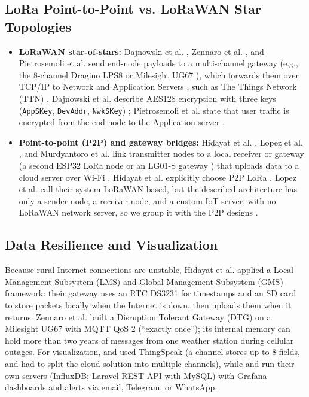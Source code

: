 \documentclass[conference]{IEEEtran}
\begin{document}
\subsection{LoRa Point-to-Point vs. LoRaWAN Star Topologies}
\begin{itemize}
    \item \textbf{LoRaWAN star-of-stars:} Dajnowski et al. \cite{dajnowski2024}, Zennaro et al. \cite{zennaro2025}, and Pietrosemoli et al. \cite{pietrosemoli2019} send end-node payloads to a multi-channel gateway (e.g., the 8-channel Dragino LPS8 \cite{dajnowski2024} or Milesight UG67 \cite{zennaro2025}), which forwards them over TCP/IP to Network and Application Servers \cite{dajnowski2024, zennaro2025, pietrosemoli2019}, such as The Things Network (TTN) \cite{dajnowski2024, pietrosemoli2019}. Dajnowski et al. describe AES128 encryption with three keys (\texttt{AppSKey}, \texttt{DevAddr}, \texttt{NwkSKey}) \cite{dajnowski2024}; Pietrosemoli et al. state that user traffic is encrypted from the end node to the Application server \cite{pietrosemoli2019}.
    \item \textbf{Point-to-point (P2P) and gateway bridges:} Hidayat et al. \cite{hidayat2019}, Lopez et al. \cite{lopez2025}, and Murdyantoro et al. \cite{murdyantoro2019} link transmitter nodes to a local receiver or gateway (a second ESP32 LoRa node \cite{hidayat2019, lopez2025} or an LG01-S gateway \cite{murdyantoro2019}) that uploads data to a cloud server over Wi-Fi \cite{hidayat2019, lopez2025, murdyantoro2019}. Hidayat et al. explicitly choose P2P LoRa \cite{hidayat2019}. Lopez et al. call their system LoRaWAN-based, but the described architecture has only a sender node, a receiver node, and a custom IoT server, with no LoRaWAN network server, so we group it with the P2P designs \cite{lopez2025}.
\end{itemize}

\subsection{Data Resilience and Visualization}
Because rural Internet connections are unstable, Hidayat et al. \cite{hidayat2019} applied a Local Management Subsystem (LMS) and Global Management Subsystem (GMS) framework: their gateway uses an RTC DS3231 for timestamps and an SD card to store packets locally when the Internet is down, then uploads them when it returns. Zennaro et al. \cite{zennaro2025} built a Disruption Tolerant Gateway (DTG) on a Milesight UG67 with MQTT QoS 2 (``exactly once''); its internal memory can hold more than two years of messages from one weather station during cellular outages. For visualization, \cite{dajnowski2024} and \cite{murdyantoro2019} used ThingSpeak (a channel stores up to 8 fields, and \cite{dajnowski2024} had to split the cloud solution into multiple channels), while \cite{zennaro2025} and \cite{lopez2025} run their own servers (InfluxDB; Laravel REST API with MySQL) with Grafana dashboards and alerts via email, Telegram, or WhatsApp.
\end{document}

